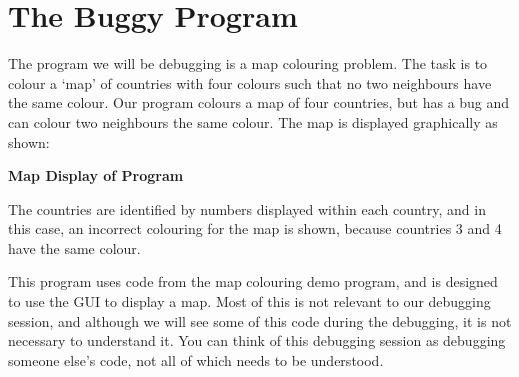 \section{The Buggy Program}

The program we will be debugging is a map colouring problem. The 
task is to colour a
`map' of countries with four colours such that no two neighbours have the
same colour. Our program colours a map of four countries, but has a bug and
can colour two neighbours the same colour. The map is displayed graphically
as shown: 

\begin{center}
\parbox{0.43\textwidth}{}

\vspace{3mm}
{\bf Map Display of Program}
\end{center}

The countries are identified by numbers displayed within each country, and 
in this case, an incorrect colouring for the map is shown, because
countries 3 and 4 have the same colour. 

This program uses code from the map colouring demo program, and is
designed to use the GUI to display a map. Most of this is
not relevant to our debugging session, and although we will see some of this
code during the debugging, it is not necessary to understand it. 
You can think of this
debugging session as debugging someone else's code, not all of which
needs to be understood.

